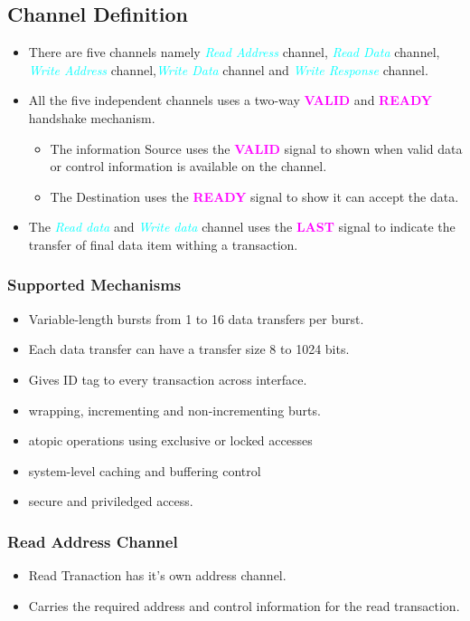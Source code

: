 \documentclass{article}
\newcommand{\chFormat}[1]{\emph{\textcolor{cyan}{#1}}}
\newcommand{\AXISignals}[1]{\textbf{\textcolor{magenta}{#1}}}
\begin{document}
\subsection{Channel Definition}
\begin{itemize}
    \item There are five channels namely \chFormat{Read Address} channel, \chFormat{Read Data} channel, \chFormat{Write Address} channel,\chFormat{Write Data} channel and \chFormat{Write Response} channel.
    \item All the five independent channels uses a two-way \AXISignals{VALID} and \AXISignals{READY} handshake mechanism.
          \begin{itemize}
              \item The information Source uses the \AXISignals{VALID} signal to shown when valid data or control information is available on the channel.
              \item The Destination uses the \AXISignals{READY} signal to show it can accept the data.
          \end{itemize}
    \item The \chFormat{Read data} and \chFormat{Write data} channel uses the \AXISignals{LAST} signal to indicate the transfer of final data item withing a transaction.
\end{itemize}
\subsubsection{Supported Mechanisms}
\begin{itemize}
    \item Variable-length bursts from 1 to 16 data transfers per burst.
    \item Each data transfer can have a transfer size 8 to 1024 bits.
    \item Gives ID tag to every transaction across interface.
    \item wrapping, incrementing and non-incrementing burts.
    \item atopic operations  using exclusive or locked accesses
    \item system-level caching and buffering control
    \item secure and priviledged access.
\end{itemize}

\subsubsection{Read Address Channel}
\begin{itemize}
    \item Read Tranaction has it's own address channel.
    \item Carries the required address and control information for the read transaction.
\end{itemize}
\end{document}

